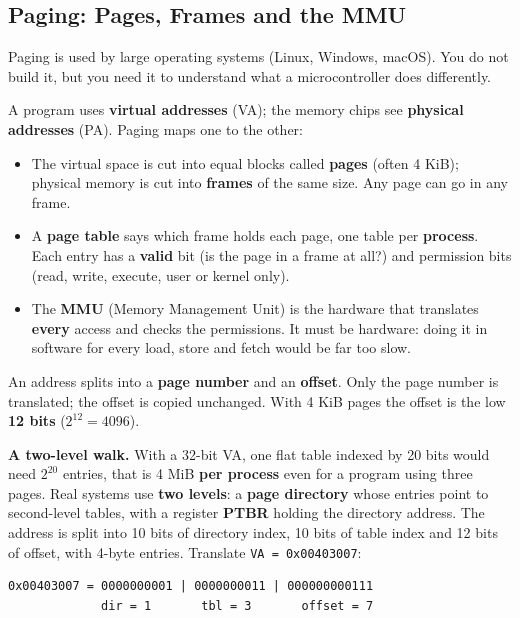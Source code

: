 \subsection{Paging: Pages, Frames and the MMU}

Paging is used by large operating systems (Linux, Windows, macOS). You do not build it, but you need it to understand what a microcontroller does differently.

A program uses \textbf{virtual addresses} (VA); the memory chips see \textbf{physical addresses} (PA). Paging maps one to the other:

\begin{itemize}
    \item The virtual space is cut into equal blocks called \textbf{pages} (often 4 KiB); physical memory is cut into \textbf{frames} of the same size. Any page can go in any frame.
    \item A \textbf{page table} says which frame holds each page, one table per \textbf{process}. Each entry has a \textbf{valid} bit (is the page in a frame at all?) and permission bits (read, write, execute, user or kernel only).
    \item The \textbf{MMU} (Memory Management Unit) is the hardware that translates \textbf{every} access and checks the permissions. It must be hardware: doing it in software for every load, store and fetch would be far too slow.
\end{itemize}

An address splits into a \textbf{page number} and an \textbf{offset}. Only the page number is translated; the offset is copied unchanged. With 4 KiB pages the offset is the low \textbf{12 bits} ($2^{12} = 4096$).

\textbf{A two-level walk.} With a 32-bit VA, one flat table indexed by 20 bits would need $2^{20}$ entries, that is 4 MiB \textbf{per process} even for a program using three pages. Real systems use \textbf{two levels}: a \textbf{page directory} whose entries point to second-level tables, with a register \textbf{PTBR} holding the directory address. The address is split into 10 bits of directory index, 10 bits of table index and 12 bits of offset, with 4-byte entries. Translate \texttt{VA = 0x00403007}:

\begin{lstlisting}
0x00403007 = 0000000001 | 0000000011 | 000000000111
             dir = 1       tbl = 3       offset = 7
\end{lstlisting}

